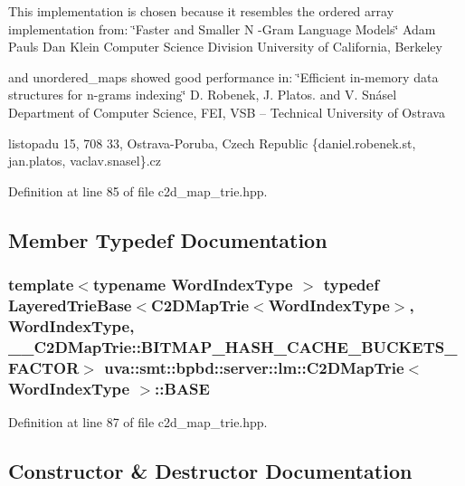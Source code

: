 This implementation is chosen because it resembles the ordered array implementation from\+: \char`\"{}\+Faster and Smaller N -\/\+Gram Language Models\char`\"{} Adam Pauls Dan Klein Computer Science Division University of California, Berkeley

and unordered\+\_\+maps showed good performance in\+: \char`\"{}\+Efficient in-\/memory data structures for n-\/grams indexing\char`\"{} D. Robenek, J. Platos. and V. Snásel Department of Computer Science, F\+E\+I, V\+S\+B – Technical University of Ostrava
\begin{DoxyEnumerate}
\item listopadu 15, 708 33, Ostrava-\/\+Poruba, Czech Republic \{daniel.\+robenek.\+st, jan.\+platos, vaclav.\+snasel\}.cz 
\end{DoxyEnumerate}

Definition at line 85 of file c2d\+\_\+map\+\_\+trie.\+hpp.



\subsection{Member Typedef Documentation}
\hypertarget{classuva_1_1smt_1_1bpbd_1_1server_1_1lm_1_1_c2_d_map_trie_a34e840aa66c6bbf9cc31b8a99738465d}{}
\subsubsection[{B\+A\+S\+E}]{\setlength{\rightskip}{0pt plus 5cm}template$<$typename Word\+Index\+Type $>$ typedef {\bf Layered\+Trie\+Base}$<${\bf C2\+D\+Map\+Trie}$<${\bf Word\+Index\+Type}$>$, {\bf Word\+Index\+Type}, \+\_\+\+\_\+\+C2\+D\+Map\+Trie\+::\+B\+I\+T\+M\+A\+P\+\_\+\+H\+A\+S\+H\+\_\+\+C\+A\+C\+H\+E\+\_\+\+B\+U\+C\+K\+E\+T\+S\+\_\+\+F\+A\+C\+T\+O\+R$>$ {\bf uva\+::smt\+::bpbd\+::server\+::lm\+::\+C2\+D\+Map\+Trie}$<$ {\bf Word\+Index\+Type} $>$\+::{\bf B\+A\+S\+E}}\label{classuva_1_1smt_1_1bpbd_1_1server_1_1lm_1_1_c2_d_map_trie_a34e840aa66c6bbf9cc31b8a99738465d}


Definition at line 87 of file c2d\+\_\+map\+\_\+trie.\+hpp.



\subsection{Constructor \& Destructor Documentation}
\hypertarget{classuva_1_1smt_1_1bpbd_1_1server_1_1lm_1_1_c2_d_map_trie_ae3613f90d14b2614a157b824ee6720e8}{}
